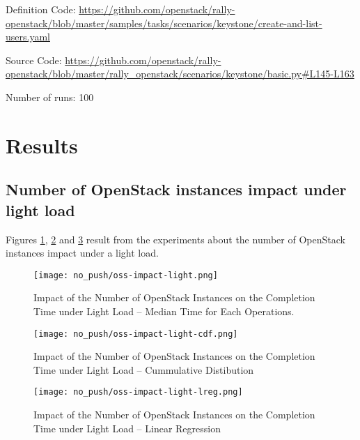 Definition Code: \url{https://github.com/openstack/rally-openstack/blob/master/samples/tasks/scenarios/keystone/create-and-list-users.yaml}

Source Code: \url{https://github.com/openstack/rally-openstack/blob/master/rally\_openstack/scenarios/keystone/basic.py#L145-L163}

Number of runs: 100

\section{Results}
\label{results}

\subsection{Number of OpenStack instances impact under light load}

Figures \ref{fig:oss-impact-light}, \ref{fig:oss-impact-light-cdf} and \ref{fig:oss-impact-light-lreg} result from the experiments about the number of OpenStack instances impact under a light load.


\begin{figure}[h]
  \centering
  \centerline{\texttt{[image: no\_push/oss-impact-light.png]}}
  \caption{Impact of the Number of OpenStack Instances on the Completion Time under Light Load – Median Time for Each Operations.}
  \label{fig:oss-impact-light}
\end{figure}


\begin{figure}[h]
  \centering
  \centerline{\texttt{[image: no\_push/oss-impact-light-cdf.png]}}
  \caption{Impact of the Number of OpenStack Instances on the Completion Time under Light Load – Cummulative Distibution}
  \label{fig:oss-impact-light-cdf}
\end{figure}


\begin{figure}[h]
  \centering
  \centerline{\texttt{[image: no\_push/oss-impact-light-lreg.png]}}
  \caption{Impact of the Number of OpenStack Instances on the Completion Time under Light Load – Linear Regression}
  \label{fig:oss-impact-light-lreg}
\end{figure}

